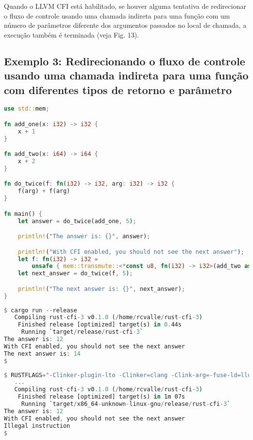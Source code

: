 \documentclass{article}
\begin{document}
Quando o LLVM CFI está habilitado, se houver alguma tentativa de redirecionar o fluxo de controle usando uma chamada indireta para uma função com um número de parâmetros diferente dos argumentos passados no local de chamada, a execução também é terminada (veja Fig. 13).


\subsection{Exemplo 3: Redirecionando o fluxo de controle usando uma chamada indireta para uma função com diferentes tipos de retorno e parâmetro}

\begin{lstlisting}[language=Rust, caption={Redirecionando o fluxo de controle usando uma chamada indireta para uma função com tipos de retorno e parâmetro diferentes do tipo de retorno esperado e argumentos passados no local de chamada.}]
use std::mem;

fn add_one(x: i32) -> i32 {
    x + 1
}

fn add_two(x: i64) -> i64 {
    x + 2
}

fn do_twice(f: fn(i32) -> i32, arg: i32) -> i32 {
    f(arg) + f(arg)
}

fn main() {
    let answer = do_twice(add_one, 5);

    println!("The answer is: {}", answer);

    println!("With CFI enabled, you should not see the next answer");
    let f: fn(i32) -> i32 =
        unsafe { mem::transmute::<*const u8, fn(i32) -> i32>(add_two as *const u8) };
    let next_answer = do_twice(f, 5);

    println!("The next answer is: {}", next_answer);
}
\end{lstlisting}

\begin{lstlisting}[language=Rust, caption={Compilação e execução da Fig. 14 com LLVM CFI desabilitado.}]
$ cargo run --release
   Compiling rust-cfi-3 v0.1.0 (/home/rcvalle/rust-cfi-3)
    Finished release [optimized] target(s) in 0.44s
     Running `target/release/rust-cfi-3`
The answer is: 12
With CFI enabled, you should not see the next answer
The next answer is: 14
$
\end{lstlisting}

\begin{lstlisting}[language=Rust, caption={Compilação e execução da Fig. 14 com LLVM CFI habilitado.}]
$ RUSTFLAGS="-Clinker-plugin-lto -Clinker=clang -Clink-arg=-fuse-ld=lld -Zsanitizer=cfi" cargo run -Zbuild-std -Zbuild-std-features --release --target x86_64-unknown-linux-gnu
   ...
   Compiling rust-cfi-3 v0.1.0 (/home/rcvalle/rust-cfi-3)
    Finished release [optimized] target(s) in 1m 07s
     Running `target/x86_64-unknown-linux-gnu/release/rust-cfi-3`
The answer is: 12
With CFI enabled, you should not see the next answer
Illegal instruction
$
\end{lstlisting}
\end{document}
